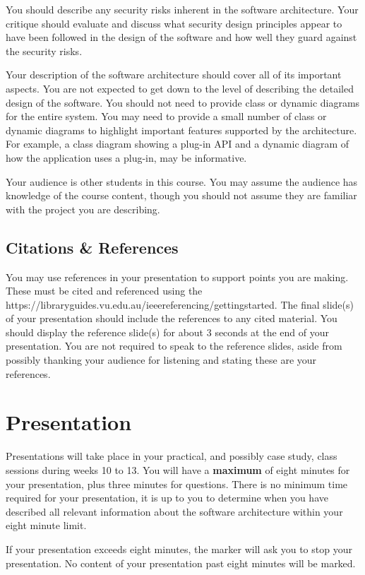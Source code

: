 \documentclass{csse4400}
\begin{document}
You should describe any security risks inherent in the software architecture.
Your critique should evaluate and discuss what security design principles appear to have been followed in the design of the software and how well they guard against the security risks.

Your description of the software architecture should cover all of its important aspects.
You are not expected to get down to the level of describing the detailed design of the software.
You should not need to provide class or dynamic diagrams for the entire system.
You may need to provide a small number of class or dynamic diagrams to highlight important features supported by the architecture.
For example, a class diagram showing a plug-in API and a dynamic diagram of how the application uses a plug-in, may be informative.

Your audience is other students in this course. You may assume the audience has knowledge of the course content,
though you should not assume they are familiar with the project you are describing.

\subsection{Citations \& References}
You may use references in your presentation to support points you are making.
These must be cited and referenced using the 
{https://libraryguides.vu.edu.au/ieeereferencing/gettingstarted}.
The final slide(s) of your presentation should include the references to any cited material.
You should display the reference slide(s) for about 3 seconds at the end of your presentation.
You are not required to speak to the reference slides,
aside from possibly thanking your audience for listening and stating these are your references.


\section{Presentation}
Presentations will take place in your practical, and possibly case study, class sessions during weeks 10 to 13.
You will have a \textbf{maximum} of eight minutes for your presentation, plus three minutes for questions.
There is no minimum time required for your presentation,
it is up to you to determine when you have described all relevant information about the software architecture within your eight minute limit.

If your presentation exceeds eight minutes, the marker will ask you to stop your presentation.
No content of your presentation past eight minutes will be marked.
\end{document}
